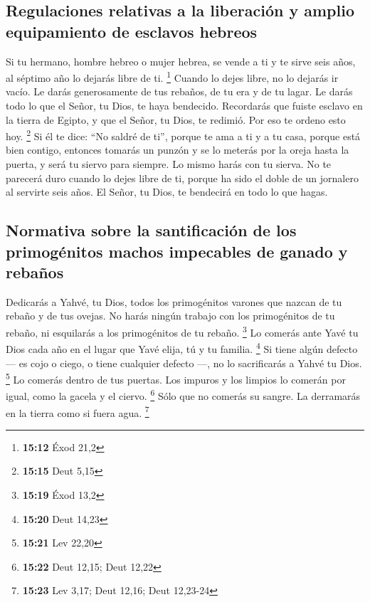 \hypertarget{regulaciones-relativas-a-la-liberaciuxf3n-y-amplio-equipamiento-de-esclavos-hebreos}{%
\subsection{Regulaciones relativas a la liberación y amplio equipamiento
de esclavos
hebreos}\label{regulaciones-relativas-a-la-liberaciuxf3n-y-amplio-equipamiento-de-esclavos-hebreos}}

 Si tu hermano, hombre hebreo o mujer hebrea, se vende a
ti y te sirve seis años, al séptimo año lo dejarás libre de ti.
\footnote{\textbf{15:12} Éxod 21,2}  Cuando lo dejes
libre, no lo dejarás ir vacío.  Le darás generosamente de
tus rebaños, de tu era y de tu lagar. Le darás todo lo que el Señor, tu
Dios, te haya bendecido.  Recordarás que fuiste esclavo
en la tierra de Egipto, y que el Señor, tu Dios, te redimió. Por eso te
ordeno esto hoy. \footnote{\textbf{15:15} Deut 5,15}  Si
él te dice: ``No saldré de ti'', porque te ama a ti y a tu casa, porque
está bien contigo,  entonces tomarás un punzón y se lo
meterás por la oreja hasta la puerta, y será tu siervo para siempre. Lo
mismo harás con tu sierva.  No te parecerá duro cuando lo
dejes libre de ti, porque ha sido el doble de un jornalero al servirte
seis años. El Señor, tu Dios, te bendecirá en todo lo que hagas.

\hypertarget{normativa-sobre-la-santificaciuxf3n-de-los-primoguxe9nitos-machos-impecables-de-ganado-y-rebauxf1os}{%
\subsection{Normativa sobre la santificación de los primogénitos machos
impecables de ganado y
rebaños}\label{normativa-sobre-la-santificaciuxf3n-de-los-primoguxe9nitos-machos-impecables-de-ganado-y-rebauxf1os}}

 Dedicarás a Yahvé, tu Dios, todos los primogénitos
varones que nazcan de tu rebaño y de tus ovejas. No harás ningún trabajo
con los primogénitos de tu rebaño, ni esquilarás a los primogénitos de
tu rebaño. \footnote{\textbf{15:19} Éxod 13,2}  Lo
comerás ante Yavé tu Dios cada año en el lugar que Yavé elija, tú y tu
familia. \footnote{\textbf{15:20} Deut 14,23}  Si tiene
algún defecto --- es cojo o ciego, o tiene cualquier defecto ---, no lo
sacrificarás a Yahvé tu Dios. \footnote{\textbf{15:21} Lev 22,20}
 Lo comerás dentro de tus puertas. Los impuros y los
limpios lo comerán por igual, como la gacela y el ciervo. \footnote{\textbf{15:22}
  Deut 12,15; Deut 12,22}  Sólo que no comerás su sangre.
La derramarás en la tierra como si fuera agua. \footnote{\textbf{15:23}
  Lev 3,17; Deut 12,16; Deut 12,23-24}

